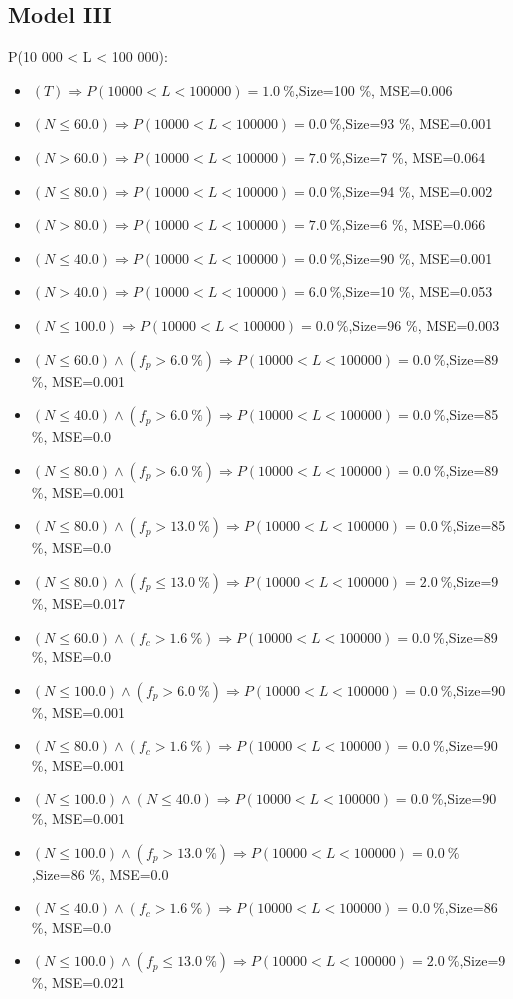 \documentclass[numbered]{CSL}
\begin{document}
\subsection{Model III}
P(10 000 < L < 100 000):
\begin{itemize}
\item $(T) \Rightarrow P(10 000 < L < 100 000) = 1.0~\%$,\hfill Size=100 \%, MSE=0.006
\item $(N \leq 60.0) \Rightarrow P(10 000 < L < 100 000) = 0.0~\%$,\hfill Size=93 \%, MSE=0.001
\item $(N > 60.0) \Rightarrow P(10 000 < L < 100 000) = 7.0~\%$,\hfill Size=7 \%, MSE=0.064
\item $(N \leq 80.0) \Rightarrow P(10 000 < L < 100 000) = 0.0~\%$,\hfill Size=94 \%, MSE=0.002
\item $(N > 80.0) \Rightarrow P(10 000 < L < 100 000) = 7.0~\%$,\hfill Size=6 \%, MSE=0.066
\item $(N \leq 40.0) \Rightarrow P(10 000 < L < 100 000) = 0.0~\%$,\hfill Size=90 \%, MSE=0.001
\item $(N > 40.0) \Rightarrow P(10 000 < L < 100 000) = 6.0~\%$,\hfill Size=10 \%, MSE=0.053
\item $(N \leq 100.0) \Rightarrow P(10 000 < L < 100 000) = 0.0~\%$,\hfill Size=96 \%, MSE=0.003
\item $(N \leq 60.0) \land (f_p > 6.0~\%) \Rightarrow P(10 000 < L < 100 000) = 0.0~\%$,\hfill Size=89 \%, MSE=0.001
\item $(N \leq 40.0) \land (f_p > 6.0~\%) \Rightarrow P(10 000 < L < 100 000) = 0.0~\%$,\hfill Size=85 \%, MSE=0.0
\item $(N \leq 80.0) \land (f_p > 6.0~\%) \Rightarrow P(10 000 < L < 100 000) = 0.0~\%$,\hfill Size=89 \%, MSE=0.001
\item $(N \leq 80.0) \land (f_p > 13.0~\%) \Rightarrow P(10 000 < L < 100 000) = 0.0~\%$,\hfill Size=85 \%, MSE=0.0
\item $(N \leq 80.0) \land (f_p \leq 13.0~\%) \Rightarrow P(10 000 < L < 100 000) = 2.0~\%$,\hfill Size=9 \%, MSE=0.017
\item $(N \leq 60.0) \land (f_c > 1.6~\%) \Rightarrow P(10 000 < L < 100 000) = 0.0~\%$,\hfill Size=89 \%, MSE=0.0
\item $(N \leq 100.0) \land (f_p > 6.0~\%) \Rightarrow P(10 000 < L < 100 000) = 0.0~\%$,\hfill Size=90 \%, MSE=0.001
\item $(N \leq 80.0) \land (f_c > 1.6~\%) \Rightarrow P(10 000 < L < 100 000) = 0.0~\%$,\hfill Size=90 \%, MSE=0.001
\item $(N \leq 100.0) \land (N \leq 40.0) \Rightarrow P(10 000 < L < 100 000) = 0.0~\%$,\hfill Size=90 \%, MSE=0.001
\item $(N \leq 100.0) \land (f_p > 13.0~\%) \Rightarrow P(10 000 < L < 100 000) = 0.0~\%$,\hfill Size=86 \%, MSE=0.0
\item $(N \leq 40.0) \land (f_c > 1.6~\%) \Rightarrow P(10 000 < L < 100 000) = 0.0~\%$,\hfill Size=86 \%, MSE=0.0
\item $(N \leq 100.0) \land (f_p \leq 13.0~\%) \Rightarrow P(10 000 < L < 100 000) = 2.0~\%$,\hfill Size=9 \%, MSE=0.021
\end{itemize}
\end{document}
